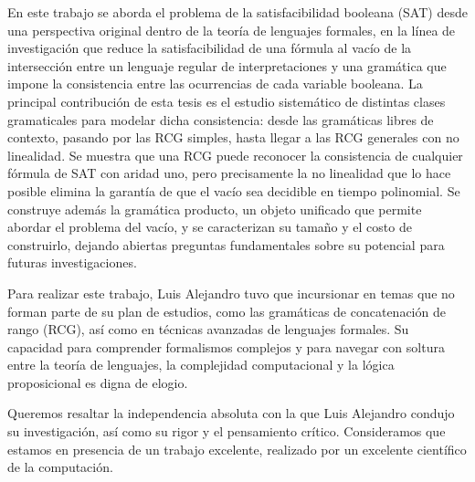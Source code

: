 \begin{opinion}
    En este trabajo se aborda el problema de la satisfacibilidad booleana
    (SAT) desde una perspectiva original dentro de la teoría de lenguajes
    formales, en la línea de investigación que reduce la satisfacibilidad de
    una fórmula al vacío de la intersección entre un lenguaje regular de
    interpretaciones y una gramática que impone la consistencia entre las
    ocurrencias de cada variable booleana. La principal contribución de esta
    tesis es el estudio sistemático de distintas clases gramaticales para
    modelar dicha consistencia: desde las gramáticas libres de contexto,
    pasando por las RCG simples, hasta llegar a las RCG generales con no
    linealidad. Se muestra que una RCG puede reconocer la consistencia de
    cualquier fórmula de SAT con aridad uno, pero precisamente la no
    linealidad que lo hace posible elimina la garantía de que el vacío sea
    decidible en tiempo polinomial. Se construye además la gramática
    producto, un objeto unificado que permite abordar el problema del vacío,
    y se caracterizan su tamaño y el costo de construirlo, dejando abiertas
    preguntas fundamentales sobre su potencial para futuras investigaciones.

    Para realizar este trabajo, Luis Alejandro tuvo que incursionar en temas
    que no forman parte de su plan de estudios, como las gramáticas de
    concatenación de rango (RCG), así como en técnicas avanzadas de lenguajes
    formales. Su capacidad para comprender formalismos complejos y para
    navegar con soltura entre la teoría de lenguajes, la complejidad
    computacional y la lógica proposicional es digna de elogio.

    Queremos resaltar la independencia absoluta con la que Luis Alejandro
    condujo su investigación, así como su rigor y el pensamiento crítico.
    Consideramos que estamos en presencia de un trabajo excelente, realizado
    por un excelente científico de la computación.

    \vspace{1cm}


\end{opinion}
